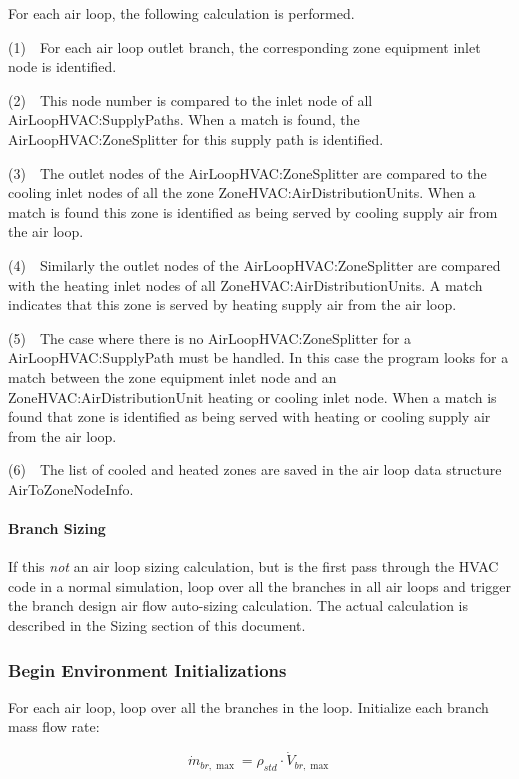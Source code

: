 For each air loop, the following calculation is performed.

(1)~~For each air loop outlet branch, the corresponding zone equipment inlet node is identified.

(2)~~This node number is compared to the inlet node of all AirLoopHVAC:SupplyPaths. When a match is found, the AirLoopHVAC:ZoneSplitter for this supply path is identified.

(3)~~The outlet nodes of the AirLoopHVAC:ZoneSplitter are compared to the cooling inlet nodes of all the zone ZoneHVAC:AirDistributionUnits. When a match is found this zone is identified as being served by cooling supply air from the air loop.

(4)~~Similarly the outlet nodes of the AirLoopHVAC:ZoneSplitter are compared with the heating inlet nodes of all ZoneHVAC:AirDistributionUnits. A match indicates that this zone is served by heating supply air from the air loop.

(5)~~The case where there is no AirLoopHVAC:ZoneSplitter for a AirLoopHVAC:SupplyPath must be handled. In this case the program looks for a match between the zone equipment inlet node and an ZoneHVAC:AirDistributionUnit heating or cooling inlet node. When a match is found that zone is identified as being served with heating or cooling supply air from the air loop.

(6)~~The list of cooled and heated zones are saved in the air loop data structure AirToZoneNodeInfo.

\paragraph{Branch Sizing}\label{branch-sizing}

If this \emph{not} an air loop sizing calculation, but is the first pass through the HVAC code in a normal simulation, loop over all the branches in all air loops and trigger the branch design air flow auto-sizing calculation. The actual calculation is described in the Sizing section of this document.

\subsubsection{Begin Environment Initializations}\label{begin-environment-initializations}

For each air loop, loop over all the branches in the loop. Initialize each branch mass flow rate:

\begin{equation}
{\dot m_{br,\max }} = {\rho_{std}} \cdot {\dot V_{br,\max }}
\end{equation}

